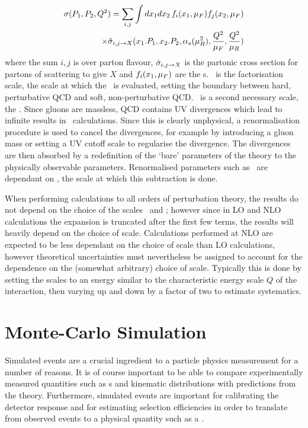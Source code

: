 \begin{equation}
\begin{split}
\sigma(P_{1}, P_{2}, Q^{2}) = \sum_{i,j} \int dx_{1} dx_{2} \, f_{i}(x_{1}, \mu_{F})
f_{j}(x_{2}, \mu_{F}) \\
\times \hat{\sigma}_{i,j\rightarrow X} (x_{1}.P_{1}, x_{2}.P_{2}, \alpha_{s}(\mu_{R}^{2}), 
\frac{Q^{2}}{\mu_{F}}, \frac{Q^{2}}{\mu_{R}})
\end{split}
\end{equation}
where the sum $i,j$ is over parton flavour, 
$\hat{\sigma}_{i,j\rightarrow X}$ is the partonic cross section for partons of
scattering to give $X$ and  $f_{i}(x_{1}, \mu_{F})$ are the \partDF s. \uF\ is the
factorisation scale, the scale at which the \partDF\ is evaluated, setting the boundary between hard, perturbative QCD and
soft, non-perturbative QCD. \uR\ is a second necessary scale, the
. Since gluons are massless, QCD contains UV
divergences which lead to infinite results in \cx\ calculations. Since 
this is clearly unphysical, a renormalisation procedure is used to cancel the
divergences, for example by introducing a gluon mass or setting a UV cutoff
scale to regularise the divergence. The divergences are then absorbed by a
redefinition of the `bare' parameters of the theory to the physically observable
parameters. Renormalised parameters such as \alphaS\ are dependant on \uR, the
scale at which this subtraction is done.

When performing calculations to all orders of perturbation theory, the results
do not depend on the choice of the scales \uR\ and \uF; however since in LO and NLO
calculations the expansion is truncated after the
first few terms,  the results will heavily depend on
the choice of scale. Calculations performed at NLO are expected to
be less dependant on the choice of scale than LO calculations, however
theoretical uncertainties must nevertheless be assigned to account for the dependence on the
(somewhat arbitrary) choice of scale. Typically this is done by setting the
scales to an energy similar to the characteristic energy scale $Q$ of the interaction, then
varying up and down by a factor of two to estimate systematics.

\section{Monte-Carlo Simulation}
\label{sec:Theory-MC}

Simulated events are a crucial ingredient to a particle physics
measurement for a number of reasons. It is of course important to be able to
compare experimentally measured quantities such as \cx s and kinematic
distributions with predictions from the theory. Furthermore, simulated events
are important for calibrating the detector response and for estimating
selection efficiencies in order to translate from observed events
to a physical quantity such as a \cx. 

